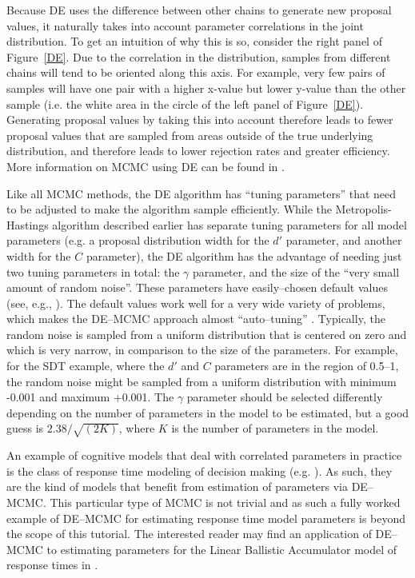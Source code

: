 Because DE uses the difference between other chains to generate new proposal values, it naturally takes into account parameter correlations in the joint distribution. To get an intuition of why this is so, consider the right panel of Figure~\ref{DE}. Due to the correlation in the distribution, samples from different chains will tend to be oriented along this axis. For example, very few pairs of samples will have one pair with a higher x-value but lower y-value than the other sample (i.e. the white area in the circle of the left panel of Figure~\ref{DE}). Generating proposal values by taking this into account therefore leads to fewer proposal values that are sampled from areas outside of the true underlying distribution, and therefore leads to lower rejection rates and greater efficiency. More information on MCMC using DE can be found in .

Like all MCMC methods, the DE algorithm has ``tuning parameters'' that need to be adjusted to make the algorithm sample efficiently. While the Metropolis-Hastings algorithm described earlier has separate tuning parameters for all model parameters (e.g. a proposal distribution width for the $d'$ parameter, and another width for the $C$ parameter), the DE algorithm has the advantage of needing just two tuning parameters in total: the $\gamma$ parameter, and the size of the ``very small amount of random noise''. These parameters have easily--chosen default values (see, e.g., ). The default values work well for a very wide variety of problems, which makes the DE--MCMC approach almost ``auto--tuning'' \cite{terBraak2006}. Typically, the random noise is sampled from a uniform distribution that is centered on zero and which is very narrow, in comparison to the size of the parameters. For example, for the SDT example, where the $d'$ and $C$ parameters are in the region of 0.5--1, the random noise might be sampled from a uniform distribution with minimum -0.001 and maximum +0.001. The $\gamma$ parameter should be selected differently depending on the number of parameters in the model to be estimated, but a good guess is $2.38/\sqrt{(2K)}$, where $K$ is the number of parameters in the model.

An example of cognitive models that deal with correlated parameters in practice is the class of response time modeling of decision making (e.g. ). As such, they are the kind of models that benefit from estimation of parameters via DE--MCMC. This particular type of MCMC is not trivial and as such a fully worked example of DE--MCMC for estimating response time model parameters is beyond the scope of this tutorial. The interested reader may find an application of DE--MCMC to estimating parameters for the Linear Ballistic Accumulator model of response times in .

